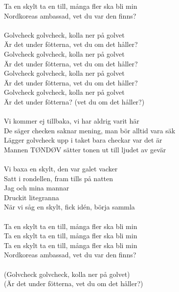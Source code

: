 \documentclass[a6paper, 10pt, twoside]{article}
\begin{document}
\begin{lyrics}
Ta en skylt ta en till, många fler ska bli min\\
Nordkoreas ambassad, vet du var den finns?\\
\vspace{5pt}\\
Golvcheck golvcheck, kolla ner på golvet\\
Är det under fötterna, vet du om det håller?\\
Golvcheck golvcheck, kolla ner på golvet\\
Är det under fötterna, vet du om det håller?\\
Golvcheck golvcheck, kolla ner på golvet\\
Är det under fötterna, vet du om det håller?\\
Golvcheck golvcheck, kolla ner på golvet\\
Är det under fötterna? (vet du om det håller?)\\
\vspace{5pt}\\
Vi kommer ej tillbaka, vi har aldrig varit här\\
De säger checken saknar mening, man bör alltid vara säk\\
Lägger golvcheck upp i taket bara checkar var det är\\
Mannen TØNDØV sätter tonen ut till ljudet av gevär\\
\vspace{5pt}\\
Vi baxa en skylt, den var galet vacker\\
Satt i rondellen, fram tills på natten\\
Jag och mina mannar\\
Druckit litegranna\\
När vi såg en skylt, fick idén, börja sammla\\
\vspace{5pt}\\
Ta en skylt ta en till, många fler ska bli min\\
Ta en skylt ta en till, många fler ska bli min\\
Ta en skylt ta en till, många fler ska bli min\\
Nordkoreas ambassad, vet du var den finns?\\
\vspace{5pt}\\
(Golvcheck golvcheck, kolla ner på golvet)\\
(Är det under fötterna, vet du om det håller?)\\

\end{lyrics}
\end{document}
